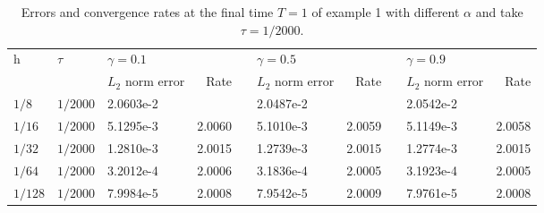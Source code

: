 \documentclass[3p,times]{elsarticle}
\begin{document}
\begin{table}[h!b!p!]
\small
\renewcommand{\arraystretch}{1.1}
\centering
\caption{\small Errors and convergence rates at the final time $T=1$ of example 1 with different $\alpha$ and take $\tau=1/2000$.}\label{tab2}
\begin{tabular}{p{0cm}p{0cm}p{1.4cm}p{1cm}p{0.5cm}p{1.4cm}p{1cm}p{0.5cm}p{1.4cm}p{1cm}}
\hline
\multicolumn{1}{l}{\multirow {2}{*}{h}}& \multicolumn{1}{l}{\multirow {2}{*}{$\tau$}}& \multicolumn{2}{l}{$\gamma=0.1$}&&\multicolumn{2}{l}{$\gamma=0.5$}&&\multicolumn{2}{l}{$\gamma=0.9$}\\
\cline{3-4}\cline{6-7} \cline{9-10}
&&\multicolumn{1}{l}{$L_2$ norm error} &\multicolumn{1}{r}{Rate} && \multicolumn{1}{l}{$L_2$ norm error} &\multicolumn{1}{r}{Rate} && \multicolumn{1}{l}{$L_2$ norm error} &\multicolumn{1}{r}{Rate} \\
\hline
\multicolumn{1}{l}{$1/8$}&\multicolumn{1}{l}{$1/2000$}&2.0603e-2&&&2.0487e-2&&&2.0542e-2\\
\multicolumn{1}{l}{$1/16$}&\multicolumn{1}{l}{$1/2000$}&5.1295e-3&\multicolumn{1}{r}{2.0060}&&5.1010e-3&\multicolumn{1}{r}{2.0059}&&5.1149e-3&\multicolumn{1}{r}{2.0058}\\
\multicolumn{1}{l}{$1/32$}&\multicolumn{1}{l}{$1/2000$}&1.2810e-3&\multicolumn{1}{r}{2.0015}&&1.2739e-3&\multicolumn{1}{r}{2.0015}&&1.2774e-3&\multicolumn{1}{r}{2.0015}\\
\multicolumn{1}{l}{$1/64$}&\multicolumn{1}{l}{$1/2000$}&3.2012e-4&\multicolumn{1}{r}{2.0006}&&3.1836e-4&\multicolumn{1}{r}{2.0005}&&3.1923e-4&\multicolumn{1}{r}{2.0005}\\
\multicolumn{1}{l}{$1/128$}&\multicolumn{1}{l}{$1/2000$}&7.9984e-5&\multicolumn{1}{r}{2.0008}&&7.9542e-5&\multicolumn{1}{r}{2.0009}&&7.9761e-5&\multicolumn{1}{r}{2.0008}\\
\hline
\end{tabular}
\end{table}
\end{document}

